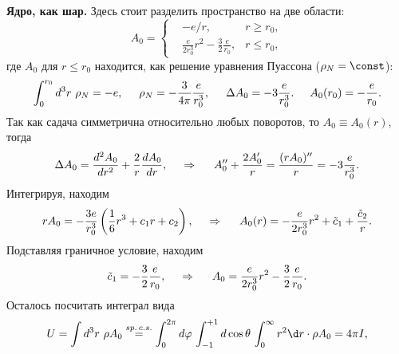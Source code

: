 \textbf{Ядро, как шар.} Здесь стоит разделить пространство на две области:
\begin{equation*}
    A_0 = \left\{\begin{aligned}
        &-e/r, &r \geq r_0, \\
        &\frac{e}{2r_0^3}r^2- \frac{3}{2}\frac{e}{r_0}, & r \leq r_0,
    \end{aligned}\right.
\end{equation*}
где $A_0$ для $r \leq r_0$ находится, как решение уравнения Пуассона ($\rho_N = \const$):
\begin{equation*}
    \int_{0}^{r_0} d^3 r \ \rho_N = - e,
    \hspace{5 mm} 
    \rho_N = - \frac{3}{4\pi}\frac{e}{r_0^3},
    \hspace{5 mm} 
    \Delta A_0 = - 3 \frac{e}{r_0^3}.
    \hspace{5 mm} 
    A_0(r_0) = - \frac{e}{r_0}.
\end{equation*}
Так как садача симметрична относительно любых поворотов, то $A_0 \equiv A_0 (r)$, тогда
\begin{equation*}
    \Delta A_0 = \frac{d^2 A_0}{d r^2} + \frac{2}{r} \frac{d A_0}{d r},
    \hspace{0.5cm} \Rightarrow \hspace{0.5cm}
    A_0'' + \frac{2 A_0'}{r} =
    \frac{(r A_0)''}{r}
    =- 3 \frac{e}{r_0^3}.
\end{equation*}
Интегрируя, находим
\begin{equation*}
    r A_0 = -\frac{3 e}{r_0^3}\left(
        \frac{1}{6}r^3 + c_1 r + c_2
    \right),
    \hspace{0.5cm} \Rightarrow \hspace{0.5cm}
    A_0(r) = -\frac{e}{2 r_0^3} r^2 + \tilde{c}_1 + \frac{\tilde{c}_2}{r}.
\end{equation*}
Подставляя граничное условие, находим
\begin{equation*}
    \tilde{c}_1 = - \frac{3}{2} \frac{e}{r_0},
    \hspace{0.5cm} \Rightarrow \hspace{0.5cm}
    A_0 = \frac{e}{2r_0^3}r^2 - \frac{3}{2} \frac{e}{r_0}.
\end{equation*}
Осталось посчитать интеграл вида
\begin{equation*}
    U = \int d^3 r \ \rho A_0 \overset{sp.\, c.s.}{=}  
    \int_{0}^{2\pi} d \varphi\, \int_{-1}^{+1} d \cos \theta\, 
    \int_{0}^{\infty}  r^2 \d r \cdot \rho A_0 = 4 \pi I,
\end{equation*}
